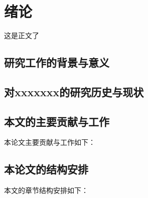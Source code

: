 \chapter{绪论}
这是正文了

\section{研究工作的背景与意义}




\section{对xxxxxxx的研究历史与现状}




\section{本文的主要贡献与工作}

本论文主要贡献与工作如下：




\section{本论文的结构安排}

本文的章节结构安排如下：


